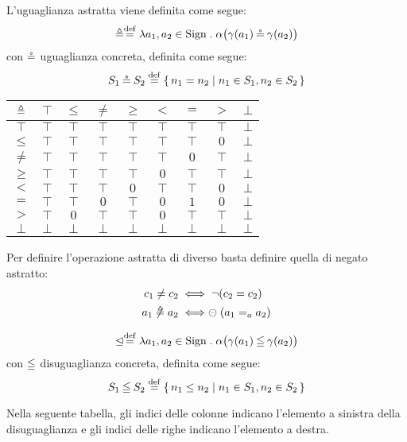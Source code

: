 \begin{definizione}
L'uguaglianza astratta viene definita come segue:
\[
  \abseq \defeq \lambda a_1,a_2 \in \Sign \st \alpha\bigl(\gamma(a_1) \coneq \gamma(a_2)\bigr)
\]
con $\mathbin{\circeq}$ uguaglianza concreta, definita come segue:
\[
  S_1 \coneq S_2 \defeq \{\, n_1 = n_2 \mid n_1 \in S_1, n_2 \in S_2 \,\}
\]
\end{definizione}

\begin{center}
  \begin{tabular}{ c | c c c c c c c c }
    $\mathrel{\triangleq}$ & $\top$ & $\leq$ & $\neq$ & $\geq$ & $<$ & $=$ & $>$ & $\bot$ \\
    \hline
    $\top$ & $\top$ & $\top$ & $\top$ & $\top$ & $\top$ & $\top$ & $\top$ & $\bot$ \\
    $\leq$ & $\top$ & $\top$ & $\top$ & $\top$ & $\top$ & $\top$ & $0$ & $\bot$\\
    $\neq$ & $\top$ & $\top$ & $\top$ & $\top$ & $\top$ & $0$ & $\top$ & $\bot$\\
    $\geq$ & $\top$ & $\top$ & $\top$ & $\top$ & $0$ & $\top$ & $\top$ & $\bot$\\
    $<$ & $\top$ & $\top$ & $\top$ & $0$ & $\top$ & $\top$ & $0$ & $\bot$\\
    $=$ & $\top$ & $\top$ & $0$ & $\top$ & $0$ & $1$ & $0$ & $\bot$\\
    $>$ & $\top$ & $0$ & $\top$ & $\top$ & $0$ & $\top$ & $\top$ & $\bot$\\
    $\bot$ & $\bot$ & $\bot$ & $\bot$ & $\bot$ & $\bot$ & $\bot$ & $\bot$ & $\bot$
  \end{tabular}
\end{center}


\begin{definizione}
Per definire l'operazione astratta di diverso basta definire quella di negato astratto:
\begin{align*}
  c_1 \neq c_2 &\iff \neg (c_2 = c_2) \\
  a_1 \mathrel{\not\triangleq} a_2 &\iff \mathrel{\circleddash} (a_1 =_a a_2)
\end{align*}
\end{definizione}

\begin{definizione}
\[
  \absleq \defeq \lambda a_1,a_2 \in \Sign \st \alpha\bigl(\gamma(a_1) \conineq \gamma(a_2)\bigr)
\]
con $\mathbin{\leqq}$ disuguaglianza concreta, definita come segue:
\[
  S_1 \conineq S_2 \defeq \{\, n_1 \leq n_2 \mid n_1 \in S_1, n_2 \in S_2 \,\}
\]
\end{definizione}
Nella seguente tabella, gli indici delle colonne indicano
l'elemento a sinistra della disuguaglianza e gli indici delle righe
indicano l'elemento a destra.

